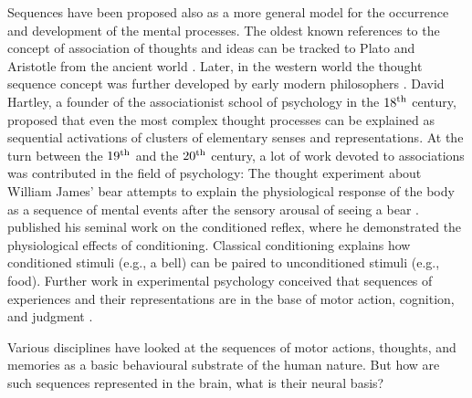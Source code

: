   Sequences have been proposed also as a more general model for the occurrence
  and development of the mental processes. The oldest known references to the
  concept of association of thoughts and ideas can be tracked to Plato and
  Aristotle from the ancient world \citep{Plato:Phaedo, Bloch2007}. Later, in
  the western world the thought sequence concept was further developed by early
  modern philosophers \citep{Hobbes, Locke, Hume, Hume2, Stewart}. David
  Hartley, a founder of the associationist school of psychology in the $18^{\rm
  th}$ century, proposed that even the most complex thought processes can be
  explained as sequential activations of clusters of elementary senses and
  representations. At the turn between the $19^{\rm th}$ and the $20^{\rm th}$
  century, a lot of work devoted to associations was contributed in the field
  of psychology: The thought experiment about William James' bear attempts to
  explain the physiological response of the body as a sequence of mental events
  after the sensory arousal of seeing a bear \citep{James1884}.
  \cite{Pavlov1897} published his seminal work on the conditioned reflex, where
  he demonstrated the physiological effects of conditioning. Classical
  conditioning explains how conditioned stimuli (e.g., a bell) can be paired to
  unconditioned stimuli (e.g., food). Further work in experimental psychology
  conceived that sequences of experiences and their representations are in the
  base of motor action, cognition, and judgment \citep{Watt1904, Titchener1905,
  Washburn1916}.

  Various disciplines have looked at the sequences of motor actions, thoughts,
  and memories as a basic behavioural substrate of the human nature. But how are
  such sequences represented in the brain, what is their neural basis?



